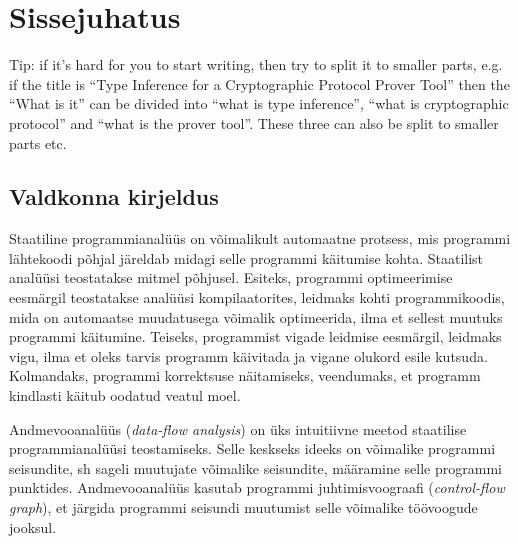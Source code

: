 \documentclass[../thesis.tex]{subfiles}
\begin{document}
\section*{Sissejuhatus}


Tip: if it's hard for you to start writing, then try to split it to smaller parts, e.g. if the title is ``Type Inference for a Cryptographic Protocol Prover Tool'' then the ``What is it'' can be divided into ``what is type inference'', ``what is cryptographic protocol'' and ``what is the prover tool''. These three can also be split to smaller parts etc.

\subsection*{Valdkonna kirjeldus}


Staatiline programmianalüüs on võimalikult automaatne protsess, mis programmi lähtekoodi põhjal järeldab midagi selle programmi käitumise kohta. Staatilist analüüsi teostatakse mitmel põhjusel. Esiteks, programmi optimeerimise eesmärgil teostatakse analüüsi kompilaatorites, leidmaks kohti programmikoodis, mida on automaatse muudatusega võimalik optimeerida, ilma et sellest muutuks programmi käitumine. Teiseks, programmist vigade leidmise eesmärgil, leidmaks vigu, ilma et oleks tarvis programm käivitada ja vigane olukord esile kutsuda. Kolmandaks, programmi korrektsuse näitamiseks, veendumaks, et programm kindlasti käitub oodatud veatul moel.

Andmevooanalüüs (\emph{data-flow analysis}) on üks intuitiivne meetod staatilise programmianalüüsi teostamiseks. Selle keskseks ideeks on võimalike programmi seisundite, sh sageli muutujate võimalike seisundite, määramine selle programmi punktides. Andmevooanalüüs kasutab programmi juhtimisvoograafi (\emph{control-flow graph}), et järgida programmi seisundi muutumist selle võimalike töövoogude jooksul.
\end{document}
